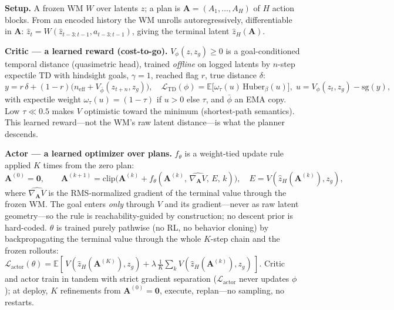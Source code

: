 \documentclass{article}
\begin{document}
\textbf{Setup.} A frozen WM $W$ over latents $z$; a plan is $\mathbf A=(A_1,\dots,A_H)$
of $H$ action blocks. From an encoded history the WM unrolls autoregressively,
differentiable in $\mathbf A$: $\hat z_t = W(\hat z_{t-3:t-1}, a_{t-3:t-1})$,
giving the terminal latent $\hat z_H(\mathbf A)$.

\textbf{Critic --- a learned reward (cost-to-go).} $V_\phi(z,z_g)\!\ge\!0$ is a
goal-conditioned temporal distance (quasimetric head), trained \emph{offline} on
logged latents by $n$-step expectile TD with hindsight goals, $\gamma\!=\!1$,
reached flag $r$, true distance $\delta$:
\begin{equation}
y = r\,\delta + (1{-}r)\big(n_{\mathrm{eff}} + V_{\bar\phi}(z_{t+n},z_g)\big),
\quad
\mathcal L_{\mathrm{TD}}(\phi)=\mathbb E\big[\omega_\tau(u)\,\mathrm{Huber}_\beta(u)\big],\;
u=V_\phi(z_t,z_g)-\mathrm{sg}(y),
\end{equation}
with expectile weight $\omega_\tau(u){=}(1{-}\tau)$ if $u{>}0$ else $\tau$, and
$\bar\phi$ an EMA copy. Low $\tau{\ll}0.5$ makes $V$ optimistic toward the
minimum (shortest-path semantics). This learned reward---not the WM's raw latent
distance---is what the planner descends.

\textbf{Actor --- a learned optimizer over plans.} $f_\theta$ is a weight-tied
update rule applied $K$ times from the zero plan:
\begin{equation}
\mathbf A^{(0)}{=}\mathbf 0,\qquad
\mathbf A^{(k+1)}=\mathrm{clip}\!\big(\mathbf A^{(k)}+f_\theta(\mathbf A^{(k)},\,\widehat{\nabla_{\!\mathbf A}V},\,E,\,k)\big),
\quad E=V(\hat z_H(\mathbf A^{(k)}),z_g),
\end{equation}
where $\widehat{\nabla_{\!\mathbf A}V}$ is the RMS-normalized gradient of the
terminal value through the frozen WM. The goal enters \emph{only} through $V$ and
its gradient---never as raw latent geometry---so the rule is reachability-guided
by construction; no descent prior is hard-coded. $\theta$ is trained purely
pathwise (no RL, no behavior cloning) by backpropagating the terminal value
through the whole $K$-step chain and the frozen rollouts:
$\mathcal L_{\mathrm{actor}}(\theta)=\mathbb E[\,V(\hat z_H(\mathbf A^{(K)}),z_g)+\lambda\,\tfrac1K\sum_k V(\hat z_H(\mathbf A^{(k)}),z_g)\,]$.
Critic and actor train in tandem with strict gradient separation ($\mathcal
L_{\mathrm{actor}}$ never updates $\phi$); at deploy, $K$ refinements from
$\mathbf A^{(0)}{=}\mathbf 0$, execute, replan---no sampling, no restarts.
\end{document}
